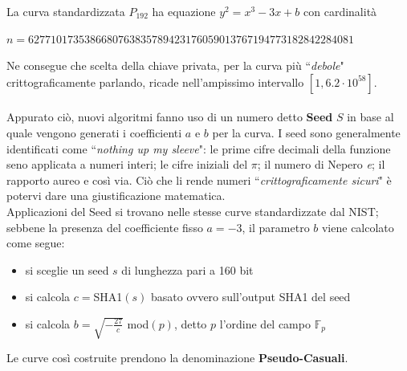 \documentclass[a4paper,12pt]{tesiinfo}
\newcommand\ddfrac[2]{\frac{\displaystyle #1}{\displaystyle #2}}
\begin{document}
La curva standardizzata $P_{192}$ ha equazione $y^2=x^3 -3x+b$ \cite{ec standard} con cardinalit\`a 
\begin{center}
$n=6277101735386680763835789423176059013767194773182842284081$
\end{center}
Ne consegue che scelta della chiave privata, per la curva pi\`u ``\textit{debole}" crittograficamente parlando, ricade nell'ampissimo intervallo $[1, 6.2\cdot 10^{58}]$.
\\
\\
Appurato ci\`o, nuovi algoritmi fanno uso di un numero detto \textbf{Seed} $S$ in base al quale vengono generati i coefficienti $a$ e $b$ per la curva. I seed sono generalmente identificati come ``\textit{nothing up my sleeve}": le prime cifre decimali della funzione seno applicata a numeri interi; le cifre iniziali del $\pi$; il numero di Nepero \textit{e}; il rapporto aureo e cos\`i via. Ci\`o che li rende numeri ``\textit{crittograficamente sicuri}" \`e potervi dare una giustificazione matematica. 
\\
Applicazioni del Seed si trovano nelle stesse curve standardizzate dal NIST; sebbene la presenza del coefficiente fisso $a=-3$, il parametro $b$ viene calcolato come segue: 
\begin{itemize}
    \item si sceglie un seed $s$ di lunghezza pari a 160 bit
    \item si calcola $c = $SHA1$(s)$ basato ovvero sull'output SHA1 del seed
    \item si calcola $b = \sqrt{-\ddfrac{27}{c}}$ mod$(p)$, detto $p$ l'ordine del campo $\mathbb{F}_p$
\end{itemize}
Le curve cos\`i costruite prendono la denominazione \textbf{Pseudo-Casuali}.
%
%
%
%
%
%
%
%
%
%
%
%
%
%
%
%
%
%
\end{document}
